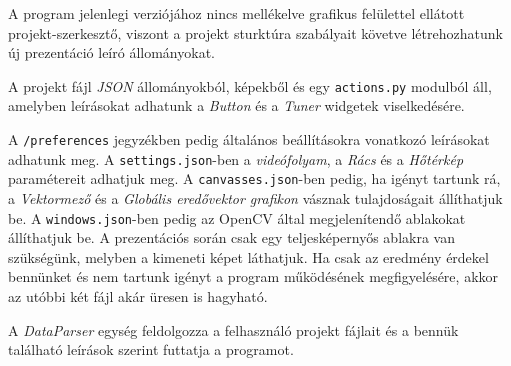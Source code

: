 

A program jelenlegi verziójához nincs mellékelve grafikus felülettel ellátott projekt-szerkesztő, viszont a projekt sturktúra szabályait követve létrehozhatunk új prezentáció leíró állományokat.

\bigskip


\bigskip

\noindent A projekt fájl \textit{JSON} állományokból, képekből és egy \texttt{actions.py} modulból áll, amelyben leírásokat adhatunk a \textit{Button} és a \textit{Tuner} widgetek viselkedésére.

A \texttt{/preferences} jegyzékben pedig általános beállításokra vonatkozó leírásokat adhatunk meg. A \texttt{settings.json}-ben a \textit{videófolyam}, a \textit{Rács} és a \textit{Hőtérkép} paramétereit adhatjuk meg. A
\texttt{canvasses.json}-ben pedig, ha igényt tartunk rá, a \textit{Vektormező} és a \textit{Globális eredővektor grafikon} vásznak tulajdoságait állíthatjuk be.
A \texttt{windows.json}-ben pedig az OpenCV által megjelenítendő ablakokat állíthatjuk be. A prezentációs során csak egy teljesképernyős ablakra van szükségünk, melyben a kimeneti képet láthatjuk. Ha csak az eredmény érdekel bennünket és nem tartunk igényt a program működésének megfigyelésére, akkor az utóbbi két fájl akár üresen is hagyható.

A \textit{DataParser} egység feldolgozza a felhasználó projekt fájlait és a bennük található leírások szerint futtatja a programot.


